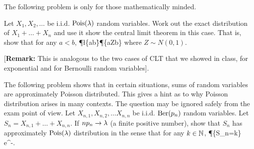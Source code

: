 \documentclass[preprint,  11pt]{amsart}
\begin{document}
\medskip
The following problem is only for those mathematically minded.
{\color{red}
\bepr Let $X_{1},X_{2},\ldots $ be i.i.d. $\mbox{Pois}(\lambda)$ random variables. Work out the exact distribution of $X_{1}+\ldots +X_{n}$ and use it show the central limit theorem in this case. That is, show that for any $a<b$,
\ba
\P\l\{a\le {}\le b\r\}\longrightarrow \P\{a\le Z\le b\}
\ea
where $Z\sim N(0,1)$.

 [{\bf Remark:} This is analogous to the two cases of CLT that we showed in class, for exponential and for Bernoulli random variables].
\eepr
}

\medskip
The following problem shows that in certain situations, sums of random variables are approximately Poisson distributed. This gives a hint as to why Poisson distribution arises in many contexts. The question may be ignored safely from the exam point of view.
{\color{red}
\bepr Let $X_{n,1},X_{n,2},\ldots X_{n,n}$ be i.i.d. $\mbox{Ber}(p_{n})$ random variables. Let $S_{n}=X_{n,1}+\ldots +X_{n,n}$.
 If $np_{n}\rightarrow \lambda$ (a finite positive number), show that $S_{n}$ has approximately $\mbox{Pois}(\lambda)$ distribution in the sense that for any $k\in \mathbb{N}$,
\ba
\P\{S_{n}=k\} \to e^{-\lam}.
\eepr
}



%
\end{document}

